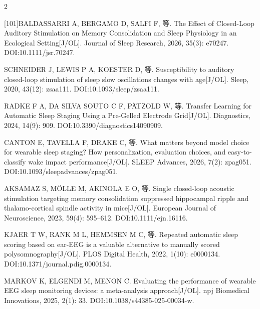 \documentclass[UTF8,zihao=5,fontset=none]{ctexart}
\begin{document}
\begin{multicols}{2}
{[101]\quad BALDASSARRI A, BERGAMO D, SALFI F, 等. The Effect of Closed-Loop Auditory Stimulation on Memory Consolidation and Sleep Physiology in an Ecological Setting[J/OL]. Journal of Sleep Research, 2026, 35(3): e70247. DOI:10.1111/jsr.70247.\par
[102]\quad SCHNEIDER J, LEWIS P A, KOESTER D, 等. Susceptibility to auditory closed-loop stimulation of sleep slow oscillations changes with age[J/OL]. Sleep, 2020, 43(12): zsaa111. DOI:10.1093/sleep/zsaa111.\par
[103]\quad RADKE F A, DA SILVA SOUTO C F, PÄTZOLD W, 等. Transfer Learning for Automatic Sleep Staging Using a Pre-Gelled Electrode Grid[J/OL]. Diagnostics, 2024, 14(9): 909. DOI:10.3390/diagnostics14090909.\par
[104]\quad CANTON E, TAVELLA F, DRAKE C, 等. What matters beyond model choice for wearable sleep staging? How personalization, evaluation choices, and easy-to-classify wake impact performance[J/OL]. SLEEP Advances, 2026, 7(2): zpag051. DOI:10.1093/sleepadvances/zpag051.\par
[105]\quad AKSAMAZ S, MÖLLE M, AKINOLA E O, 等. Single closed-loop acoustic stimulation targeting memory consolidation suppressed hippocampal ripple and thalamo-cortical spindle activity in mice[J/OL]. European Journal of Neuroscience, 2023, 59(4): 595--612. DOI:10.1111/ejn.16116.\par
[106]\quad KJAER T W, RANK M L, HEMMSEN M C, 等. Repeated automatic sleep scoring based on ear-EEG is a valuable alternative to manually scored polysomnography[J/OL]. PLOS Digital Health, 2022, 1(10): e0000134. DOI:10.1371/journal.pdig.0000134.\par
[107]\quad MARKOV K, ELGENDI M, MENON C. Evaluating the performance of wearable EEG sleep monitoring devices: a meta-analysis approach[J/OL]. npj Biomedical Innovations, 2025, 2(1): 33. DOI:10.1038/s44385-025-00034-w.\par
}
\end{multicols}
\end{document}
